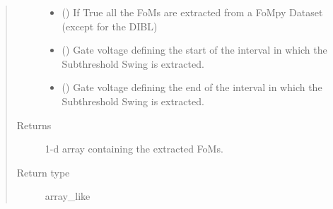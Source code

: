 \documentclass[letterpaper,10pt,english,openany, oneside]{sphinxmanual}
\begin{document}
\begin{fulllineitems}
\begin{quote}
\begin{description}
\begin{itemize}
\item {} 
 () \textendash{} If True all the FoMs are extracted from a FoMpy Dataset (except for the DIBL)

\item {} 
 () \textendash{} Gate voltage defining the start of the interval in which the Subthreshold Swing is extracted.

\item {} 
 () \textendash{} Gate voltage defining the end of the interval in which the Subthreshold Swing is extracted.

\end{itemize}

\item[{Returns}] \leavevmode
{} \textendash{} 1-d array containing the extracted FoMs.

\item[{Return type}] \leavevmode
array\_like

\end{description}\end{quote}

\end{fulllineitems}

\end{document}
